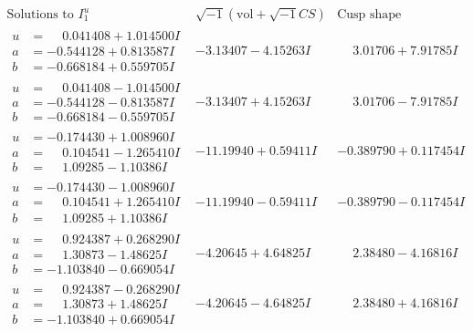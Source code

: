 \documentclass[1p]{elsarticle_modified}
\theoremstyle{definition}
\newcommand{\I}{\sqrt{-1}}
\begin{document}
$$\begin{array}{c|c|c}  
\text{Solutions to }I^u_{1}& \I (\text{vol} + \sqrt{-1}CS) & \text{Cusp shape}\\
 \hline 
\begin{aligned}
u &= \phantom{-}0.041408 + 1.014500 I \\
a &= -0.544128 + 0.813587 I \\
b &= -0.668184 + 0.559705 I\end{aligned}
 & -3.13407 - 4.15263 I & \phantom{-}3.01706 + 7.91785 I \\ \hline\begin{aligned}
u &= \phantom{-}0.041408 - 1.014500 I \\
a &= -0.544128 - 0.813587 I \\
b &= -0.668184 - 0.559705 I\end{aligned}
 & -3.13407 + 4.15263 I & \phantom{-}3.01706 - 7.91785 I \\ \hline\begin{aligned}
u &= -0.174430 + 1.008960 I \\
a &= \phantom{-}0.104541 - 1.265410 I \\
b &= \phantom{-}1.09285 - 1.10386 I\end{aligned}
 & -11.19940 + 0.59411 I & -0.389790 + 0.117454 I \\ \hline\begin{aligned}
u &= -0.174430 - 1.008960 I \\
a &= \phantom{-}0.104541 + 1.265410 I \\
b &= \phantom{-}1.09285 + 1.10386 I\end{aligned}
 & -11.19940 - 0.59411 I & -0.389790 - 0.117454 I \\ \hline\begin{aligned}
u &= \phantom{-}0.924387 + 0.268290 I \\
a &= \phantom{-}1.30873 - 1.48625 I \\
b &= -1.103840 - 0.669054 I\end{aligned}
 & -4.20645 + 4.64825 I & \phantom{-}2.38480 - 4.16816 I \\ \hline\begin{aligned}
u &= \phantom{-}0.924387 - 0.268290 I \\
a &= \phantom{-}1.30873 + 1.48625 I \\
b &= -1.103840 + 0.669054 I\end{aligned}
 & -4.20645 - 4.64825 I & \phantom{-}2.38480 + 4.16816 I \\ \hline\begin{aligned}

\end{aligned}
\end{array}$$
\end{document}
